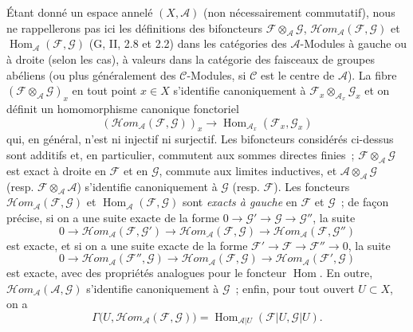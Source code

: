 \begin{env}[4.1.5]
\label{0.4.1.5-fr}
Étant donné un espace annelé $(X,\mathcal{A})$ (non nécessairement
commutatif), nous ne rappellerons pas ici les définitions des bifoncteurs
$\mathcal{F}\otimes_{\mathcal{A}}\mathcal{G}$,
$\mathcal{H}\!om_{\mathcal{A}}(\mathcal{F},\mathcal{G})$ et
$\operatorname{Hom}_{\mathcal{A}}(\mathcal{F},\mathcal{G})$
(G, II, 2.8 et 2.2) dans les catégories des $\mathcal{A}$-Modules à gauche ou
à droite (selon les cas), à valeurs dans la catégorie des faisceaux de groupes
abéliens (ou plus
généralement des $\mathcal{C}$-Modules, si $\mathcal{C}$ est le centre de
$\mathcal{A}$). La fibre
$(\mathcal{F}\otimes_{\mathcal{A}}\mathcal{G})_x$ en tout point $x\in X$
s'identifie canoniquement à
$\mathcal{F}_x\otimes_{\mathcal{A}_x}\mathcal{G}_x$ et on définit un
homomorphisme canonique fonctoriel
\[
  (\mathcal{H}\!om_{\mathcal{A}}(\mathcal{F},\mathcal{G}))_x
  \longrightarrow
  \operatorname{Hom}_{\mathcal{A}_x}(\mathcal{F}_x,\mathcal{G}_x)
\]
qui, en général, n'est ni injectif ni surjectif. Les bifoncteurs considérés
ci-dessus sont additifs et, en particulier, commutent aux sommes directes
finies~; $\mathcal{F}\otimes_{\mathcal{A}}\mathcal{G}$ est exact à droite en
$\mathcal{F}$ et en $\mathcal{G}$, commute aux limites inductives, et
$\mathcal{A}\otimes_{\mathcal{A}}\mathcal{G}$
(resp. $\mathcal{F}\otimes_{\mathcal{A}}\mathcal{A}$) s'identifie
canoniquement à $\mathcal{G}$ (resp. $\mathcal{F}$). Les foncteurs
$\mathcal{H}\!om_{\mathcal{A}}(\mathcal{F},\mathcal{G})$ et
$\operatorname{Hom}_{\mathcal{A}}(\mathcal{F},\mathcal{G})$ sont
\emph{exacts à gauche} en $\mathcal{F}$ et $\mathcal{G}$~; de façon précise,
si on a une suite exacte de la forme
$0\to\mathcal{G}'\to\mathcal{G}\to\mathcal{G}''$, la suite
\[
  0\longrightarrow
  \mathcal{H}\!om_{\mathcal{A}}(\mathcal{F},\mathcal{G}')
  \longrightarrow
  \mathcal{H}\!om_{\mathcal{A}}(\mathcal{F},\mathcal{G})
  \longrightarrow
  \mathcal{H}\!om_{\mathcal{A}}(\mathcal{F},\mathcal{G}'')
\]
est exacte, et si on a une suite exacte de la forme
$\mathcal{F}'\to\mathcal{F}\to\mathcal{F}''\to0$, la suite
\[
  0\longrightarrow
  \mathcal{H}\!om_{\mathcal{A}}(\mathcal{F}'',\mathcal{G})
  \longrightarrow
  \mathcal{H}\!om_{\mathcal{A}}(\mathcal{F},\mathcal{G})
  \longrightarrow
  \mathcal{H}\!om_{\mathcal{A}}(\mathcal{F}',\mathcal{G})
\]
est exacte, avec des propriétés analogues pour le foncteur
$\operatorname{Hom}$. En outre,
$\mathcal{H}\!om_{\mathcal{A}}(\mathcal{A},\mathcal{G})$ s'identifie
canoniquement à $\mathcal{G}$~; enfin, pour tout ouvert $U\subset X$, on a
\[
  \Gamma\bigl(U,\mathcal{H}\!om_{\mathcal{A}}(\mathcal{F},\mathcal{G})\bigr)
  =
  \operatorname{Hom}_{\mathcal{A}|U}(\mathcal{F}|U,\mathcal{G}|U).
\]


\end{env}
